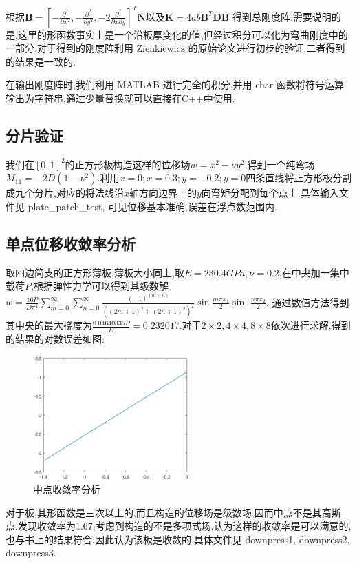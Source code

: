 根据$\mathbf{B}=[-\frac{\partial^2}{\partial x^2},-\frac{\partial^2}{\partial y^2},-2\frac{\partial^2}{\partial x \partial y}]^T\mathbf{N}$以及$\mathbf{K}=4ab\mathbf{B}^T\mathbf{D}\mathbf{B}$ 得到总刚度阵.需要说明的是,这里的形函数事实上是一个沿板厚变化的值,但经过积分可以化为弯曲刚度中的一部分.对于得到的刚度阵利用 Zienkiewicz 的原始论文进行初步的验证,二者得到的结果是一致的.

在输出刚度阵时,我们利用 MATLAB 进行完全的积分,并用 char 函数将符号运算输出为字符串,通过少量替换就可以直接在C++中使用.

\subsection{分片验证}

我们在$[0,1]^2$的正方形板构造这样的位移场$w=x^2-\nu y^2$,得到一个纯弯场$M_{11}=-2D(1-\nu^2)$.利用$x=0;x=0.3;y=-0.2;y=0$四条直线将正方形板分割成九个分片,对应的将法线沿$x$轴方向边界上的$y$向弯矩分配到每个点上.具体输入文件见 plate\_patch\_test, 可见位移基本准确,误差在浮点数范围内.

\subsection{单点位移收敛率分析}

取四边简支的正方形薄板,薄板大小同上,取$E=230.4GPa,\nu=0.2$,在中央加一集中载荷$P$,根据弹性力学可以得到其级数解$w=\frac{16P}{D\pi^4}\sum\limits_{m=0}^{\infty}\sum\limits_{n=0}^{\infty} \frac{(-1)^(m+n)}{((2m+1)^2+(2n+1)^2)^2}\sin\frac{m\pi x_1}{2}\sin$ $\frac{n\pi x_2}{2}$, 通过数值方法得到其中央的最大挠度为$\frac{0.04640335P}{D}=0.232017$.对于$2\times 2,4\times 4,8\times 8$依次进行求解,得到的结果的对数误差如图:

\begin{figure}[htbp]
  \centering
  \includegraphics[width=6cm]{plateconvergence}
  \caption{中点收敛率分析}
\end{figure}
对于板,其形函数是三次以上的,而且构造的位移场是级数场,因而中点不是其高斯点.发现收敛率为$1.67$,考虑到构造的不是多项式场,认为这样的收敛率是可以满意的,也与书上的结果符合,因此认为该板是收敛的.具体文件见 downpress1, downpress2, downpress3.

